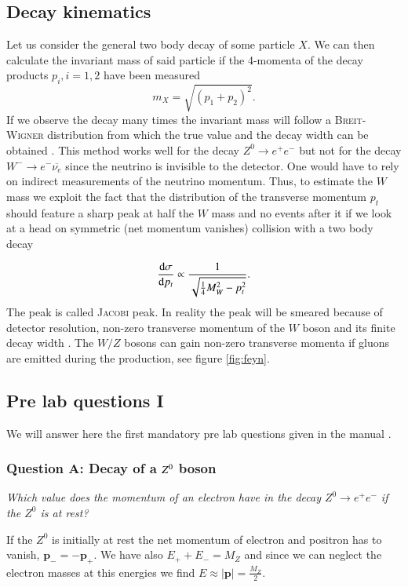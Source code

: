 \documentclass[11pt,a4paper,notitlepage]{scrartcl}
\begin{document}
\subsection{Decay kinematics}
Let us consider the general two body decay of some particle $X$. We can then calculate the invariant mass of said particle if the 4-momenta of the decay products $p_i,i=1,2$ have been measured $$m_X=\sqrt{(p_1+p_2)^2}.$$ If we observe the decay many times the invariant mass will follow a \textsc{Breit-Wigner} distribution from which the true value and the decay width can be obtained \cite{manual}. This method works well for the decay $Z^0\to e^+e^-$ but not for the decay $W^-\to e^-\overline{\nu_e}$ since the neutrino is invisible to the detector. One would have to rely on indirect measurements of the neutrino momentum. Thus, to estimate the $W$ mass we exploit the fact that the distribution of the transverse momentum $p_t$ should feature a sharp peak at half the $W$ mass and no events after it if we look at a head on symmetric (net momentum vanishes) collision with a two body decay \cite{povh} 

\begin{equation}
	\frac{\text{d}\sigma}{\text{d} p_t}\propto\frac{1}{\sqrt{\frac{1}{4}M_W^2-p_t^2}}.
\end{equation}
The peak is called \textsc{Jacobi} peak. In reality the peak will be smeared because of detector resolution, non-zero transverse momentum of the $W$ boson and its finite decay width \cite{manual}. The $W/Z$ bosons can gain non-zero transverse momenta if gluons are emitted during the production, see figure \ref{fig:feyn}.

\subsection{Pre lab questions I}
We will answer here the first mandatory pre lab questions given in the manual \cite{manual}.
\subsubsection*{Question A: Decay of a $\boldmath Z^0$ boson}
\indent \emph{Which value does the momentum of an electron have in the decay $Z^0\to e^+e^-$ if the $Z^0$ is at rest?}

If the $Z^0$ is initially at rest the net momentum of electron and positron has to vanish, $\mathbf{p}_-=-\mathbf{p}_+$. We have also $E_++E_-=M_Z$ and since we can neglect the electron masses at this energies we find $E\approx|\mathbf{p}|=\frac{M_Z}{2}$. 
\end{document}
